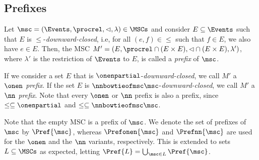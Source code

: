 
\subsection{Prefixes}

\begin{definition}[Prefix]
	Let $\msc = (\Events,\procrel,\lhd,\lambda) \in \MSCs$ and consider
	$E \subseteq \Events$ such that $E$ is ${\le}$-\emph{downward-closed}, i.e,
	for all $(e,f) \in {\le}$ such that $f \in E$, we also have $e \in E$.
	Then, the MSC $M' = (E,{\procrel} \cap (E \times E),{\lhd} \cap (E \times E),\lambda')$,
	where $\lambda'$ is the restriction of $\Events$ to $E$, is called a \emph{prefix}
	of $\msc$. 	
\end{definition}

If we consider a set $E$ that is ${\onenpartial}$-\emph{downward-closed}, we call $M'$ a \emph{$\onen$ prefix}.
If the set $E$ is ${\nnbowtieofmsc\msc}$-\emph{downward-closed}, we call $M'$ a \emph{$\nn$ prefix}. Note that every $\onen$ or $\nn$ prefix is also a prefix, since $\le \subseteq {\onenpartial}$ and $\le \subseteq {\nnbowtieofmsc\msc}$.

Note that the empty MSC is a prefix of $\msc$.
We denote the set of prefixes of $\msc$ by $\Pref{\msc}$, whereas $\Prefonen{\msc}$ and $\Prefnn{\msc}$ are used for the $\onen$ and the $\nn$ variants, respectively.
This is extended to sets $L \subseteq \MSCs$ as expected, letting
$\Pref{L} = \bigcup_{\msc \in L} \Pref{\msc}$.

